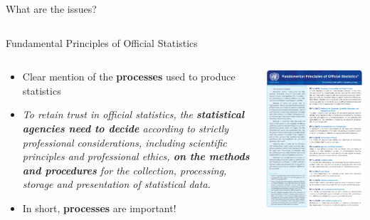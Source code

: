 \documentclass[xcolor=x11names,compress, aspectratio=169]{beamer}
\renewcommand{\(}{\begin{columns}}
\renewcommand{\)}{\end{columns}}
\newcommand{\<}[1]{\begin{column}{#1}}
\renewcommand{\>}{\end{column}}
\begin{document}
\begin{frame}{What are the issues?}
\begin{columns}[T]
\begin{column}{0.5\textwidth}
\begin{itemize}
         \end{itemize}
    \end{column}
  \end{columns}
\end{frame}

\begin{frame}{Fundamental Principles of Official Statistics}
  \begin{columns}[T]
    \begin{column}{0.6\textwidth}
      \begin{itemize}[<+->]
        \item Clear mention of the \textbf{processes} used to produce statistics
        \item \emph{To retain trust in official statistics, the \textbf{statistical agencies need to decide} according to strictly professional considerations, including scientific principles and professional ethics, \textbf{on the methods and procedures} for the collection, processing, storage and presentation of statistical data.}
      \item In short, \textbf{processes} are important!
      \end{itemize}
    \end{column}
    \begin{column}{0.4\textwidth}
      \includegraphics[width=\textwidth]{FundamentalPrinciplesOS.PNG}

\end{column}
\end{columns}
\end{frame}
\end{document}
